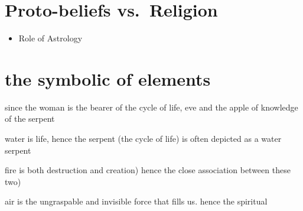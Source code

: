 \documentclass[]{book}
\providecommand{\tightlist}{%
  \setlength{\itemsep}{0pt}\setlength{\parskip}{0pt}}
\begin{document}
\hypertarget{proto-beliefs-vs.-religion}{%
\section{Proto-beliefs vs.~Religion}\label{proto-beliefs-vs.-religion}}

\begin{itemize}
\tightlist
\item
  Role of Astrology
\end{itemize}

\hypertarget{the-symbolic-of-elements}{%
\section{the symbolic of elements}\label{the-symbolic-of-elements}}

since the woman is the bearer of the cycle of life, eve and the apple of knowledge of the serpent

water is life, hence the serpent (the cycle of life) is often depicted as a water serpent

fire is both destruction and creation) hence the close association between these two)

air is the ungraspable and invisible force that fills us. hence the spiritual


\end{document}
